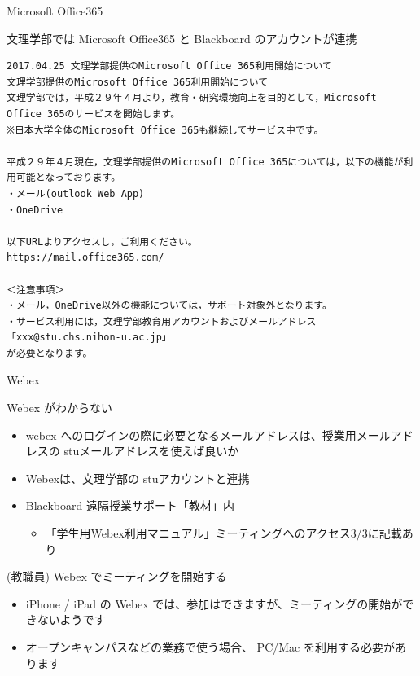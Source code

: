 \documentclass[a4j,10pt]{jsarticle}
\def\lthtmlcheckvsize{\ifdim\ht\sizebox<\vsize 
  \ifdim\wd\sizebox<\hsize\expandafter\hfill\fi \expandafter\vfill
  \else\expandafter\vss\fi}%
\begin{document}
{\begin{frame}[label={sec:org6e73ec1},fragile]{Microsoft Office365}
\begin{block}{文理学部では Microsoft Office365 と Blackboard のアカウントが連携}
\begin{verbatim}
2017.04.25 文理学部提供のMicrosoft Office 365利用開始について
文理学部提供のMicrosoft Office 365利用開始について
文理学部では，平成２９年４月より，教育・研究環境向上を目的として，Microsoft Office 365のサービスを開始します。
※日本大学全体のMicrosoft Office 365も継続してサービス中です。

平成２９年４月現在，文理学部提供のMicrosoft Office 365については，以下の機能が利用可能となっております。
・メール(outlook Web App)
・OneDrive

以下URLよりアクセスし，ご利用ください。
https://mail.office365.com/

＜注意事項＞
・メール，OneDrive以外の機能については，サポート対象外となります。
・サービス利用には，文理学部教育用アカウントおよびメールアドレス
「xxx@stu.chs.nihon-u.ac.jp」
が必要となります。\end{verbatim}

\end{block}
\end{frame}%
\lthtmlfigureZ
\lthtmlcheckvsize\clearpage}

{\newpage\clearpage
{}%
\begin{frame}[label={sec:org64d8fce},fragile]{Webex}
\begin{block}{Webex がわからない}
\begin{itemize}
\item webex へのログインの際に必要となるメールアドレスは、授業用メールアドレスの stuメールアドレスを使えば良いか
\par
\item Webexは、文理学部の stuアカウントと連携
\item Blackboard 遠隔授業サポート「教材」内
\begin{itemize}
\item 「学生用Webex利用マニュアル」ミーティングへのアクセス3/3に記載あり
\end{itemize}
\end{itemize}
\end{block}
\par
\begin{block}{(教職員) Webex でミーティングを開始する}
\begin{itemize}
\item iPhone / iPad の Webex では、参加はできますが、ミーティングの開始ができないようです
\item オープンキャンパスなどの業務で使う場合、 PC/Mac を利用する必要があります
\end{itemize}
\end{block}
\end{frame}%
\lthtmlfigureZ
\lthtmlcheckvsize\clearpage}
\end{document}
